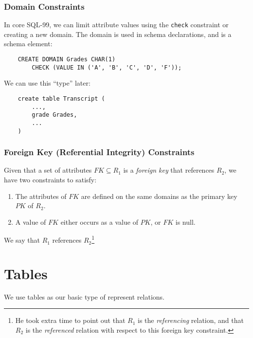                 \subsubsection{Domain Constraints} %
                \label{ssub:domain_constraints}
                    In core SQL-99, we can limit attribute values using the \verb|check| constraint or creating a new domain.
                    The domain is used in schema declarations, and is a schema element:
                    \begin{verbatim}
    CREATE DOMAIN Grades CHAR(1)
        CHECK (VALUE IN ('A', 'B', 'C', 'D', 'F'));
                    \end{verbatim}
                    We can use this ``type'' later:
                    \begin{verbatim}
    create table Transcript (
        ...,
        grade Grades,
        ...
    )
                    \end{verbatim}
                \subsubsection{Foreign Key (Referential Integrity) Constraints} %
                \label{ssub:foreign_key_referential_integrity_constraints}
                    Given that a set of attributes $FK \subseteq R_1$ is a \textit{foreign key} that references $R_2$, we have two constraints to satisfy:
                    \begin{enumerate}
                        \item The attributes of $FK$ are defined on the same domains as the primary key $PK$ of $R_2$.
                        \item A value of $FK$ either occurs as a value of $PK$, or $FK$ is null.
                    \end{enumerate}
                    We say that $R_1$ references $R_2$\footnote{He took extra time to point out that $R_1$ is the \textit{referencing} relation, and that $R_2$ is the \textit{referenced} relation with respect to this foreign key constraint.}
            \section{Tables} %
            \label{sec:tables}
                We use tables as our basic type of represent relations.

